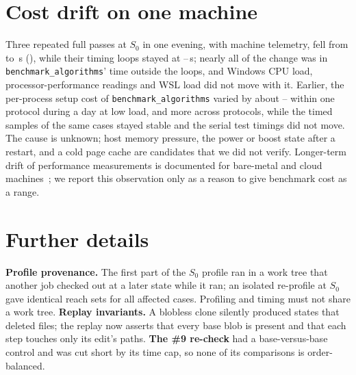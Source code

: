 \section{Cost drift on one machine}
\label{app:drift}
Three repeated full passes at $S_0$ in one evening, with machine telemetry, fell from \DriftEveningHi{} to \DriftEveningLo\,s (\DriftEveningRatio\x), while their timing loops stayed at \DriftLoopsLo--\DriftLoopsHi\,s; nearly all of the change was in \texttt{benchmark\_algorithms}' time outside the loops, and Windows CPU load, processor-performance readings and WSL load did not move with it.
Earlier, the per-process setup cost of \texttt{benchmark\_algorithms} varied by about \DriftWithinLo--\DriftWithinHi\x{} within one protocol during a day at low load, and more across protocols, while the timed samples of the same cases stayed stable and the serial test timings did not move.
The cause is unknown; host memory pressure, the power or boost state after a restart, and a cold page cache are candidates that we did not verify.
Longer-term drift of performance measurements is documented for bare-metal and cloud machines~\cite{henning2025when}; we report this observation only as a reason to give benchmark cost as a range.

\section{Further details}
\label{app:lessons-detail}
\textbf{Profile provenance.} The first part of the $S_0$ profile ran in a work tree that another job checked out at a later state while it ran; an isolated re-profile at $S_0$ gave identical reach sets for all \ReprofileCases{} affected cases. Profiling and timing must not share a work tree.
\textbf{Replay invariants.} A blobless clone silently produced states that deleted files; the replay now asserts that every base blob is present and that each step touches only its edit's paths.
\textbf{The \#9 re-check} had a base-versus-base control and was cut short by its time cap, so none of its comparisons is order-balanced.
